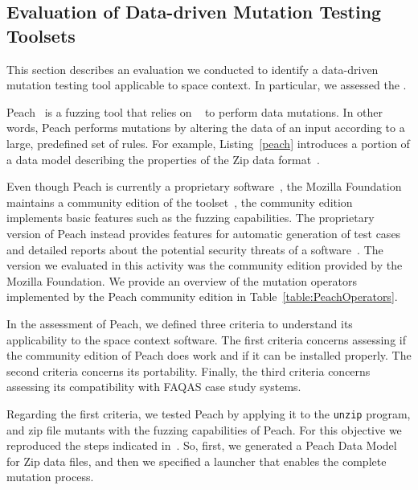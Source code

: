 \clearpage
\subsection{Evaluation of Data-driven Mutation Testing Toolsets}
\label{sec:toolsComparisonDataDriven}

This section describes an evaluation we conducted to identify a data-driven mutation testing tool applicable to space context. In particular, we assessed the .






Peach~\cite{PeachMozilla,PeachFuzzer} is a fuzzing tool that relies on ~\cite{pham2016model,spike} to perform data mutations. In other words, Peach performs mutations by altering the data of an input according to a large, predefined set of rules. For example, Listing~\ref{peach} introduces a portion of a data model describing the properties of the Zip data format~\cite{zipformat}. 

Even though Peach is currently a proprietary software~\cite{PeachFuzzer}, the Mozilla Foundation maintains a community edition of the toolset~\cite{PeachMozilla}, the community edition implements basic features such as the fuzzing capabilities. The proprietary version of Peach instead provides features for automatic generation of test cases and detailed reports about the potential security threats of a software~\cite{PeachFuzzer}. The version we evaluated in this activity was the community edition provided by the Mozilla Foundation. We provide an overview of the mutation operators implemented by the Peach community edition in Table~\ref{table:PeachOperators}.


In the assessment of Peach, we defined three criteria to understand its applicability to the space context software. The first criteria concerns assessing if the community edition of Peach does work and if it can be installed properly. The second criteria concerns its portability. Finally, the third criteria concerns assessing its compatibility with FAQAS case study systems.

Regarding the first criteria, we tested Peach by applying it to the \texttt{unzip} program, and zip file mutants with the fuzzing capabilities of Peach. For this objective we reproduced the steps indicated in~\cite{zipexample}. So, first, we generated a Peach Data Model for Zip data files, and then we specified a launcher that enables the complete mutation process.

